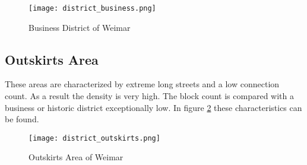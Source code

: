 \begin{figure}[!ht]
    \centering
    \begin{mdframed}[style=mdthight, userdefinedwidth=0.4\textwidth, align=center]
        \texttt{[image: district\_business.png]}
    \end{mdframed}
    \caption{Business District of Weimar}
    \label{fig:business_district}
\end{figure}

\FloatBarrier
\subsection{Outskirts Area}
\label{sec:outskits}
These areas are characterized by extreme long streets and a low connection count. As a result the density is very high. The block count is compared with a business or historic district exceptionally low. In figure \ref{fig:outskirts_district} these characteristics can be found.

\begin{figure}[!ht]
    \centering
    \begin{mdframed}[style=mdthight, userdefinedwidth=0.6\textwidth, align=center]
        \texttt{[image: district\_outskirts.png]}
    \end{mdframed}
    \caption{Outskirts Area of Weimar}
    \label{fig:outskirts_district}
\end{figure}
